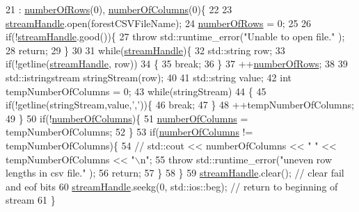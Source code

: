 \begin{DoxyCode}
21                                                       : \hyperlink{classcsvHandle_a61b2327480d1685e7fd64d4cba139ac5}{numberOfRows}(0), 
      \hyperlink{classcsvHandle_aee792b10c2ad6e21c68cfe84d6b7ff46}{numberOfColumns}(0)\{
22 
23             \hyperlink{classcsvHandle_ab2900581db37409635ccfd878693fb48}{streamHandle}.open(forestCSVFileName);
24             \hyperlink{classcsvHandle_a61b2327480d1685e7fd64d4cba139ac5}{numberOfRows} = 0;
25 
26             \textcolor{keywordflow}{if}(!\hyperlink{classcsvHandle_ab2900581db37409635ccfd878693fb48}{streamHandle}.good())\{
27                 \textcolor{keywordflow}{throw} std::runtime\_error(\textcolor{stringliteral}{"Unable to open file."} );
28                 \textcolor{keywordflow}{return};
29             \}
30 
31             \textcolor{keywordflow}{while}(\hyperlink{classcsvHandle_ab2900581db37409635ccfd878693fb48}{streamHandle})\{
32                 std::string row;
33                 \textcolor{keywordflow}{if}(!getline(\hyperlink{classcsvHandle_ab2900581db37409635ccfd878693fb48}{streamHandle}, row))
34                 \{
35                     \textcolor{keywordflow}{break};
36                 \}
37                 ++\hyperlink{classcsvHandle_a61b2327480d1685e7fd64d4cba139ac5}{numberOfRows};
38 
39                 std::istringstream stringStream(row);
40 
41                 std::string value;
42                 \textcolor{keywordtype}{int} tempNumberOfColumns = 0;
43                 \textcolor{keywordflow}{while}(stringStream)
44                 \{
45                     \textcolor{keywordflow}{if}(!getline(stringStream,value,\textcolor{charliteral}{','}))\{
46                         \textcolor{keywordflow}{break};
47                     \}
48                     ++tempNumberOfColumns;
49                 \}
50                 \textcolor{keywordflow}{if}(!\hyperlink{classcsvHandle_aee792b10c2ad6e21c68cfe84d6b7ff46}{numberOfColumns})\{
51                     \hyperlink{classcsvHandle_aee792b10c2ad6e21c68cfe84d6b7ff46}{numberOfColumns} = tempNumberOfColumns; 
52                 \}
53                 \textcolor{keywordflow}{if}(\hyperlink{classcsvHandle_aee792b10c2ad6e21c68cfe84d6b7ff46}{numberOfColumns} != tempNumberOfColumns)\{
54         \textcolor{comment}{//          std::cout << numberOfColumns << " " << tempNumberOfColumns << "\(\backslash\)n";}
55                     \textcolor{keywordflow}{throw} std::runtime\_error(\textcolor{stringliteral}{"uneven row lengths in csv file."} );
56                     \textcolor{keywordflow}{return};
57                 \}
58             \}
59             \hyperlink{classcsvHandle_ab2900581db37409635ccfd878693fb48}{streamHandle}.clear(); \textcolor{comment}{// clear fail and eof bits}
60             \hyperlink{classcsvHandle_ab2900581db37409635ccfd878693fb48}{streamHandle}.seekg(0, std::ios::beg); \textcolor{comment}{// return to beginning of stream}
61         \}
\end{DoxyCode}



